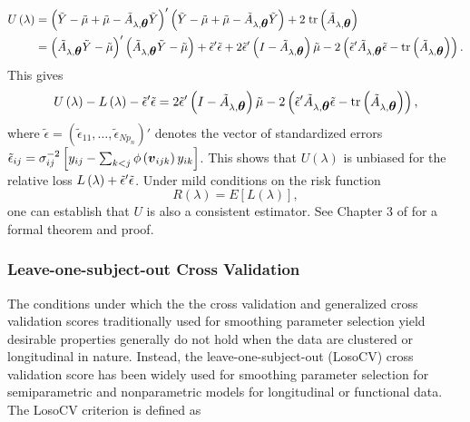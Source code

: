 \begin{align*}
U\left(\lambda\right) &= \left( \tilde{Y} - \tilde{\mu} + \tilde{\mu} - \tilde{A}_{\lambda,\mbox{\boldmath $\theta$}} \tilde{Y} \right)'\left( \tilde{Y} - \tilde{\mu} + \tilde{\mu} - \tilde{A}_{\lambda,\mbox{\boldmath $\theta$}} \tilde{Y} \right) + 2\;\mbox{tr}\left(\tilde{A}_{\lambda,\mbox{\boldmath $\theta$}}\right) \\
&= \left(\tilde{A}_{\lambda,\mbox{\boldmath $\theta$}} \tilde{Y} - \tilde{\mu} \right)'\left( \tilde{A}_{\lambda,\mbox{\boldmath $\theta$}} \tilde{Y} - \tilde{\mu}\right) + \tilde{\epsilon}'\tilde{\epsilon} + 2\tilde{\epsilon}' \left( I- \tilde{A}_{\lambda,\mbox{\boldmath $\theta$}}\right)\tilde{\mu}- 2\left( \tilde{\epsilon}'\tilde{A}_{\lambda,\mbox{\boldmath $\theta$}} \tilde{\epsilon} -  \mbox{tr}\left(\tilde{A}_{\lambda,\mbox{\boldmath $\theta$}}\right)\right).
\end{align*}
\noindent
This gives
\begin{equation*} 
U\left(\lambda\right) - L\left(\lambda\right) - \tilde{\epsilon}'\tilde{\epsilon}  =  2\tilde{\epsilon}' \left( I- \tilde{A}_{\lambda,\mbox{\boldmath $\theta$}}\right)\tilde{\mu}- 2\left( \tilde{\epsilon}'\tilde{A}_{\lambda,\mbox{\boldmath $\theta$}} \tilde{\epsilon} -  \mbox{tr}\left(\tilde{A}_{\lambda,\mbox{\boldmath $\theta$}}\right)\right), 
\end{equation*}
 \noindent
where $\tilde{\epsilon} = \left(\tilde{\epsilon}_{11}, \dots, \tilde{\epsilon}_{Np_n}\right)'$ denotes the vector of standardized errors $\tilde{\epsilon}_{ij} = {\sigma^{-2}_{ij}}\left[y_{ij} -  \sum_{k<j} \phi\left(\mbox{\boldmath $v$}_{ijk} \right) y_{ik}\right]$. This shows that $U\left(\lambda\right)$ is unbiased for the relative loss $L\left(\lambda\right) + \tilde{\epsilon}'\tilde{\epsilon}$.  Under mild conditions on the risk function
  \[
 R\left(\lambda\right) = E\left[L\left(\lambda\right)\right],
 \]
\noindent
one can establish that $U$ is also a consistent estimator. See Chapter 3 of \cite{gu2013smoothing} for a formal theorem and proof.


\subsubsection{Leave-one-subject-out Cross Validation}  
The conditions under which the the cross validation and generalized cross validation scores traditionally used for smoothing parameter selection yield desirable properties generally do not hold when the data are clustered or longitudinal in nature. Instead, the leave-one-subject-out (LosoCV) cross validation score has been widely used for smoothing parameter selection for semiparametric and nonparametric models for longitudinal or functional data. The LosoCV criterion is defined as

